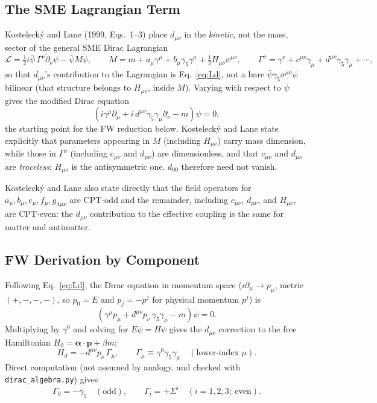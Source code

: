 \documentclass[main]{subfiles}
\begin{document}
\subsection{The SME Lagrangian Term}

Kostelecký and Lane (1999, Eqs.~1--3) place $d_{\mu\nu}$ in the
\emph{kinetic}, not the mass, sector of the general SME Dirac Lagrangian
\begin{equation}
  \mathcal L = \tfrac12 i\bar\psi\,\Gamma^\nu\overleftrightarrow\partial_\nu\psi
  - \bar\psi M\psi, \qquad
  M = m + a_\mu\gamma^\mu + b_\mu\gamma_5\gamma^\mu + \tfrac12H_{\mu\nu}\sigma^{\mu\nu},
  \qquad
  \Gamma^\nu = \gamma^\nu + c^{\mu\nu}\gamma_\mu + d^{\mu\nu}\gamma_5\gamma_\mu + \cdots,
\end{equation}
so that $d_{\mu\nu}$'s contribution to the Lagrangian is
Eq.~\eqref{eq:Ld}, not a bare $\bar\psi\gamma_5\sigma^{\mu\nu}\psi$
bilinear (that structure belongs to $H_{\mu\nu}$, inside $M$). Varying with
respect to $\bar\psi$ gives the modified Dirac equation
\begin{equation}
  \left(i\gamma^\mu\partial_\mu + i\,d^{\mu\nu}\gamma_5\gamma_\mu\partial_\nu - m\right)\psi = 0,
\end{equation}
the starting point for the FW reduction below. Kostelecký and Lane state
explicitly that parameters appearing in $M$ (including $H_{\mu\nu}$) carry
mass dimension, while those in $\Gamma^\nu$ (including $c_{\mu\nu}$ and
$d_{\mu\nu}$) are dimensionless, and that $c_{\mu\nu}$ and $d_{\mu\nu}$ are
\emph{traceless}; $H_{\mu\nu}$ is the antisymmetric one. $d_{00}$
therefore need not vanish.

Kostelecký and Lane also state directly that the field operators for
$a_\mu, b_\mu, e_\mu, f_\mu, g_{\lambda\mu\nu}$ are CPT-odd and the
remainder, including $c_{\mu\nu}$, $d_{\mu\nu}$, and $H_{\mu\nu}$, are
CPT-even: the $d_{\mu\nu}$ contribution to the effective coupling is the
same for matter and antimatter.

\subsection{FW Derivation by Component}

Following Eq.~\eqref{eq:Ld}, the Dirac equation in momentum space
($i\partial_\mu\to p_\mu$, metric $(+,-,-,-)$, so $p_0=E$ and $p_j=-p^j$
for physical momentum $p^j$) is
\begin{equation}
  \left(\gamma^\mu p_\mu + d^{\mu\nu}p_\nu\,\gamma_5\gamma_\mu - m\right)\psi = 0.
\end{equation}
Multiplying by $\gamma^0$ and solving for $E\psi=H\psi$ gives the
$d_{\mu\nu}$ correction to the free Hamiltonian
$H_0=\boldsymbol\alpha\cdot\mathbf p+\beta m$:
\begin{equation}
  H_d = -d^{\mu\nu}p_\nu\,\Gamma_\mu, \qquad
  \Gamma_\mu \equiv \gamma^0\gamma_5\gamma_\mu \quad (\text{lower-index }\mu).
\end{equation}
Direct computation (not assumed by analogy, and checked with
\texttt{dirac\_algebra.py}) gives
\begin{equation}
  \Gamma_0 = -\gamma_5 \quad (\text{odd}), \qquad
  \Gamma_i = +\Sigma^i \quad (i=1,2,3;\ \text{even}).
\end{equation}
\end{document}
